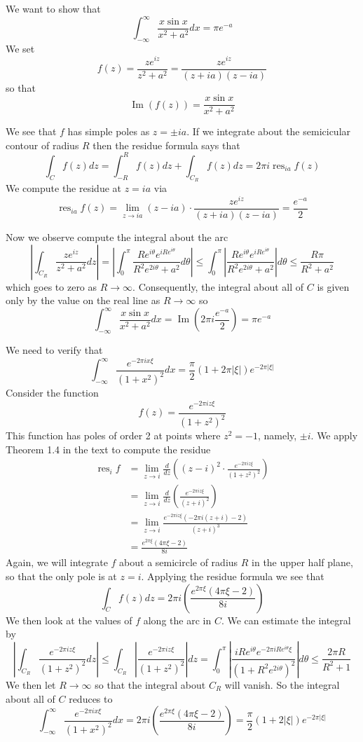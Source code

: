 \documentclass{article}
\newcommand{\exercise}[1]{\noindent{\textbf{Exercise #1:}}}
\newcommand{\res}{\operatorname{res}}
\newcommand{\imag}{\mathrel{\text{Im}}}
\begin{document}
\exercise{3.8.4}

We want to show that
\[
\int_{-\infty}^\infty \frac{x\sin x}{x^2+a^2}dx = \pi e^{-a}
\]
We set
\[
f(z) = \frac{ze^{iz}}{z^2 + a^2} = \frac{ze^{iz}}{(z+ia)(z-ia)}
\]
so that
\[
\imag(f(z)) =  \frac{x\sin x}{x^2+a^2}
\]

We see that $f$ has simple poles as $z = \pm ia$. If we integrate
about the semicicular contour of radius $R$ then the residue formula
says that
\[
\int_C f(z)dz = \int_{-R}^R f(z)dz + \int_{C_R} f(z)dz = 2\pi i\res_{ia} f(z)
\]
We compute the residue at $z = ia$ via
\[
\res_{ia} f(z) = \lim_{z\to ia} (z-ia)\cdot
\frac{ze^{iz}}{(z+ia)(z-ia)} = \frac{e^{-a}}{2}
\]

Now we observe compute the integral about the arc
\[
\left|\int_{C_R} \frac{ze^{iz}}{z^2 + a^2}dz\right| = \left|\int_{0}^\pi
    \frac{Re^{i\theta}e^{iRe^{i\theta}}}{R^2e^{2i\theta} +
      a^2}d\theta\right| \leq \int_{0}^\pi\left|
      \frac{Re^{i\theta}e^{iRe^{i\theta}}}{R^2e^{2i\theta} +
        a^2}\right|d\theta \leq \frac{R\pi}{R^2 + a^2}
\]
which goes to zero as $R \to \infty$. Consequently, the integral about
all of $C$ is given only by the value on the real line as $R\to
\infty$ so
\[
\int_{-\infty}^\infty \frac{x\sin x}{x^2+a^2}dx = \imag \left(2\pi
i\frac{e^{-a}}{2}\right) = \pi e^{-a}
\]
\exercise{3.8.5}

We need to verify that
\[
\int_{-\infty}^\infty \frac{e^{-2\pi ix\xi}}{(1+x^2)^2}dx =
\frac{\pi}{2}(1+2\pi|\xi |)e^{-2\pi |\xi |}
\]
Consider the function
\[
f(z) = \frac{e^{-2\pi iz\xi}}{(1+z^2)^2}
\]
This function has poles of order 2 at points where $z^2 = -1$, namely,
$\pm i$. We apply Theorem 1.4 in the text to compute the residue
\begin{align*}
  \res_i f &= \lim_{z \to i} \frac{d}{dz}\left((z -
    i)^2
    \cdot\frac{e^{-2\pi iz\xi}} {(1+z^2)^2}\right)\\
  &= \lim_{z \to i}\frac{d}{dz}\left(\frac{e^{-2\pi iz\xi}}
    {(z+i)^2}\right) \\
  &= \lim_{z \to i} \frac{e^{-2\pi i z\xi}(-2\pi i(z+i) - 2)}{(z+i)^3} \\
  &= \frac{e^{2\pi\xi}(4\pi\xi - 2)}{8i}
\end{align*}
Again, we will integrate $f$ about a semicircle of radius $R$ in the
upper half plane, so that the only pole is at $z = i$. Applying the
residue formula we see that
\[
\int_C f(z)dz = 2\pi i \left(\frac{e^{2\pi\xi}(4\pi\xi - 2)}{8i}\right)
\]
We then look at the values of $f$ along the arc in $C$. We can
estimate the integral by
\[
\left|\int_{C_R} \frac{e^{-2\pi iz\xi}}{(1+z^2)^2}dz\right| \leq
\int_{C_R} \left|\frac{e^{-2\pi iz\xi}}{(1+z^2)^2}\right|dz =
\int_0^\pi \left|\frac{iRe^{i\theta}e^{-2\pi
      iRe^{i\theta}\xi}}{(1+R^2e^{2i\theta})^2}\right| d\theta \leq
\frac{2\pi R}{R^2 + 1}
\]
We then let $R\to\infty$ so that the integral about $C_R$ will
vanish. So the integral about all of $C$ reduces to
\[
\int_{-\infty}^\infty \frac{e^{-2\pi ix\xi}}{(1+x^2)^2}dx = 2\pi
i\left(\frac{e^{2\pi\xi}(4\pi\xi - 2)}{8i}\right) =
\frac{\pi}{2}(1+2|\xi |)e^{-2\pi|\xi |}
\]
\end{document}
